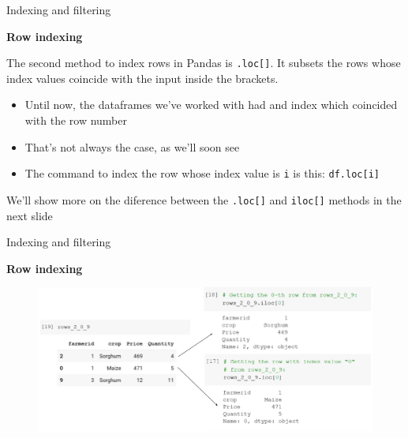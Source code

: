 \documentclass[aspectratio=169]{beamer}
\begin{document}
\begin{frame}{Indexing and filtering}

	\textbf{Row indexing}

	The second method to index rows in Pandas is \texttt{.loc[]}. It subsets the rows whose index values coincide with the input inside the brackets.

	\begin{itemize}
		\item Until now, the dataframes we've worked with had and index which coincided with the row number
		\item That's not always the case, as we'll soon see
		\item The command to index the row whose index value is \texttt{i} is this: \texttt{df.loc[i]}
	\end{itemize}

We'll show more on the diference between the \texttt{.loc[]} and \texttt{iloc[]} methods in the next slide

\end{frame}

\begin{frame}{Indexing and filtering}

	\textbf{Row indexing}

	\begin{figure}
		\centering
		\includegraphics[width=\linewidth]{img/row_loc_iloc.png}
	\end{figure}

\end{frame}
\end{document}
